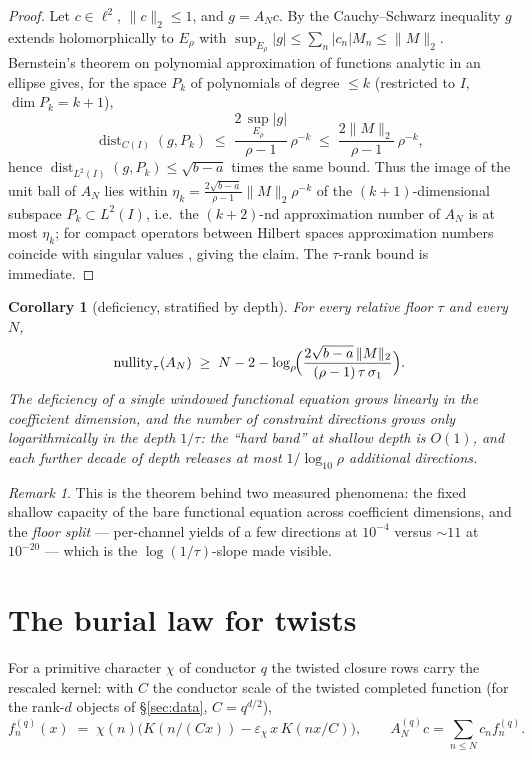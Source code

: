 \documentclass[11pt]{article}
\newtheorem{corollary}[theorem]{Corollary}
\theoremstyle{definition}
\theoremstyle{remark}
\newtheorem{remark}[theorem]{Remark}
\begin{document}
\begin{proof}
Let $c\in\ell^2$, $\|c\|_2\le1$, and $g=A_Nc$.  By the Cauchy--Schwarz
inequality $g$ extends holomorphically to $E_\rho$ with
$\sup_{E_\rho}|g|\le\sum_n|c_n|M_n\le\|M\|_2$.  Bernstein's theorem on
polynomial approximation of functions analytic in an ellipse
\cite[Thm.~8.2]{Trefethen} gives, for the space $P_k$ of polynomials of
degree $\le k$ (restricted to $I$, $\dim P_k=k+1$),
\[
\operatorname{dist}_{C(I)}(g,P_k)\;\le\;\frac{2\,\sup_{E_\rho}|g|}{\rho-1}\,
\rho^{-k}\;\le\;\frac{2\|M\|_2}{\rho-1}\,\rho^{-k},
\]
hence $\operatorname{dist}_{L^2(I)}(g,P_k)\le\sqrt{b-a}$ times the same
bound.  Thus the image of the unit ball of $A_N$ lies within
$\eta_k=\tfrac{2\sqrt{b-a}}{\rho-1}\|M\|_2\rho^{-k}$ of the
$(k{+}1)$-dimensional subspace $P_k\subset L^2(I)$, i.e.\ the
$(k{+}2)$-nd approximation number of $A_N$ is at most $\eta_k$; for compact
operators between Hilbert spaces approximation numbers coincide with
singular values \cite[Thm.~2.5.3]{Pinkus}, giving the claim.  The
$\tau$-rank bound is immediate.
\end{proof}

\begin{corollary}[deficiency, stratified by depth]\label{cor:deficiency}
For every relative floor $\tau$ and every $N$,
\[
\operatorname{nullity}_\tau(A_N)\;\ge\;N-2-
\log_\rho\!\Bigl(\frac{2\sqrt{b-a}\,\|M\|_2}{(\rho-1)\,\tau\,\sigma_1}\Bigr).
\]
The deficiency of a single windowed functional equation grows linearly in
the coefficient dimension, and the number of constraint directions grows
only logarithmically in the depth $1/\tau$: the ``hard band'' at shallow
depth is $O(1)$, and each further decade of depth releases at most
$1/\log_{10}\rho$ additional directions.
\end{corollary}

\begin{remark}
This is the theorem behind two measured phenomena: the fixed shallow
capacity of the bare functional equation across coefficient dimensions, and
the \emph{floor split} --- per-channel yields of a few directions at
$10^{-4}$ versus $\sim11$ at $10^{-20}$ --- which is the
$\log(1/\tau)$-slope made visible.
\end{remark}

\section{The burial law for twists}\label{sec:burial}

For a primitive character $\chi$ of conductor $q$ the twisted closure rows
carry the rescaled kernel: with $C$ the conductor scale of the twisted
completed function (for the rank-$d$ objects of \S\ref{sec:data},
$C=q^{d/2}$),
\[
f^{(q)}_n(x)\;=\;\chi(n)\bigl(K(n/(Cx))-\varepsilon_\chi\,x\,K(nx/C)\bigr),
\qquad A^{(q)}_N c=\sum_{n\le N}c_nf^{(q)}_n .
\]
\end{document}
